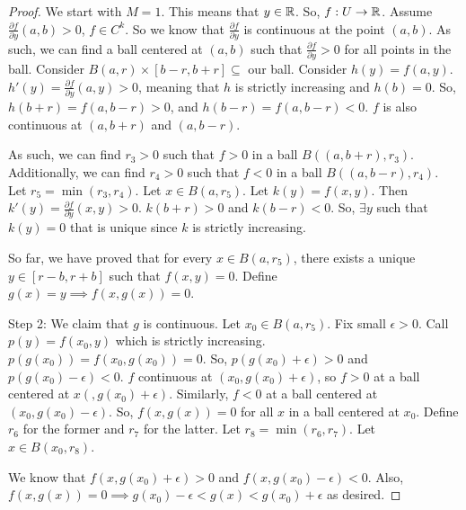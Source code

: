 \documentclass{report}
\begin{document}
\begin{proof}
    We start with $M=1$. This means that $y \in \RR$. So, $f : U \to \RR$. Assume $\frac{\partial f}{\partial y}(a, b) > 0$, $f \in C^k$. So we know that $\frac{\partial f}{\partial y}$ is continuous at the point $(a, b)$. As such, we can find a ball centered at $(a, b)$ such that $\frac{\partial f}{\partial y} > 0$ for all points in the ball. Consider $B(a, r) \times [b - r, b + r] \subseteq$ our ball. Consider $h(y) = f(a, y)$. $h'(y) = \frac{\partial f}{\partial y}(a, y) > 0$, meaning that $h$ is strictly increasing and $h(b) = 0$. So, $h(b + r) = f(a, b-r)  > 0$, and $h(b - r) = f(a, b-r) < 0$. $f$ is also continuous at $(a, b+r)$ and $(a, b-r)$. 
    
    As such, we can find $r_3 > 0$ such that $f > 0$ in a ball $B((a, b+r), r_3)$. Additionally, we can find $r_4 > 0$ such that $f < 0$ in a ball $B((a, b-r), r_4)$. Let $r_5 = \min(r_3, r_4)$. Let $x \in B(a, r_5)$. Let $k(y) = f(x, y)$. Then $k'(y) = \frac{\partial f}{\partial y}(x, y) > 0$. $k(b + r) > 0$ and $k(b-r) < 0$. So, $\exists y$ such that $k(y) = 0$ that is unique since $k$ is strictly increasing. 

    So far, we have proved that for every $x \in B(a, r_5)$, there exists a unique $y \in [r-b, r+b]$ such that $f(x, y) = 0$. Define $g(x) = y \implies f(x, g(x)) = 0$. 

    Step 2: We claim that $g$ is continuous. Let $x_0 \in B(a, r_5)$. Fix small $\epsilon > 0$. Call $p(y) = f(x_0 , y)$ which is strictly increasing. $p(g(x_0)) = f(x_0, g(x_0)) = 0$. So, $p(g(x_0) + \epsilon) > 0$ and $p(g(x_0) - \epsilon) < 0$. $f$ continuous at $(x_0, g(x_0) + \epsilon)$, so $f > 0$ at a ball centered at $x(, g(x_0) + \epsilon)$. Similarly, $f < 0$ at a ball centered at $(x_0, g(x_0) - \epsilon)$. So, $f(x, g(x)) = 0$ for all $x$ in a ball centered at $x_0$. Define $r_6$ for the former and $r_7$ for the latter. Let $r_8 = \min(r_6, r_7)$. Let $x \in B(x_0, r_8)$.

    We know that $f(x, g(x_0) + \epsilon) > 0$ and $f(x, g(x_0) - \epsilon) < 0$. Also, $f(x, g(x)) = 0 \implies g(x_0) - \epsilon < g(x) < g(x_0) + \epsilon$ as desired.


\end{proof}
\end{document}
